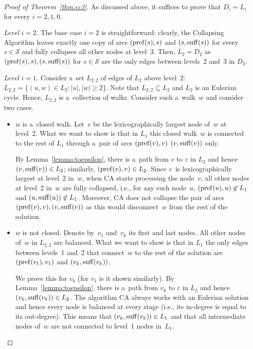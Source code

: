 \begin{proof}[Proof of Theorem~\ref{thm:cc3}]
As discussed above, it suffices to prove that $D_i=L_i$ for every $i=2,1,0$.

\begin{description}
\item {\em Level $i=2$.} The base case $i=2$ is straightforward: clearly, the Collapsing Algorithm leaves exactly one copy of arcs $(\operatorname{pref}(s), s)$ and $(s, \operatorname{suff}(s))$ for every $s \in \mathcal{S}$ and fully collapses all other nodes at level~$3$. Then, $L_2=D_2$ as $(\operatorname{pref}(s), s), (s, \operatorname{suff}(s))$ for $s \in \mathcal{S}$ are the only edges between levels~2 and~3 in $D_3$.

\item {\em Level $i=1$.} Consider a~set $L_{2,2}$ of edges of $L_2$ above level~$2$: $L_{2,2}=\{(u,w) \in L_2 \colon |u|,|w| \ge 2\}$. Note that $L_{2,2} \subseteq L_2$ and $L_2$ is an Eulerian cycle. Hence, $L_{2,2}$ is a~collection of walks. Consider such a~walk~$w$ and consider two cases.
\begin{itemize}
\item $w$ is a~closed walk. Let~$v$ be the lexicographically largest node of~$w$ at level~2. What we want to show is that in $L_1$ this closed walk~$w$ is connected to the rest of $L_1$ through a~pair of arcs $(\operatorname{pref}(v), v)$ $(v, \operatorname{suff}(v))$ only.

By Lemma~\ref{lemma:toepsilon}, there is a~path from $v$ to $\varepsilon$ in $L_2$ and hence $(v, \operatorname{suff}(v)) \in L_2$; similarly, $(\operatorname{pref}(v), v) \in L_2$. Since $v$~is lexicographically largest at level~$2$ in~$w$, when CA starts processing the node~$v$, all other nodes at level~2 in~$w$ are fully collapsed, i.e., for any such node~$u$, $(\operatorname{pref}(u), u) \not \in L_1$ and $(u, \operatorname{suff}(u)) \not \in  L_1$. Moreover, CA does not collapse the pair of arcs 
$(\operatorname{pref}(v), v), (v, \operatorname{suff}(v))$ as this would disconnect~$w$ from the rest of the solution.

\item $w$ is not closed. Denote by~$v_1$ and~$v_k$ its first and last nodes. All other nodes of~$w$ in $L_{2,2}$ are balanced. What we want to show is that in $L_1$ the only edges between levels~1 and~2 that connect~$w$ to the rest of the solution are $(\operatorname{pref}(v_1), v_1)$ and $(v_k, \operatorname{suff}(v_k))$.

We prove this for $v_k$ (for $v_1$ is it shown similarly). By Lemma~\ref{lemma:toepsilon}, there is a~path from $v_k$ to $\varepsilon$ in $L_2$ and hence $(v_k, \operatorname{suff}(v_k)) \in L_2$. The algorithm CA always works with an Eulerian solution and hence every node is balanced at every stage (i.e., its in-degree is equal to its out-degree). This means that $(v_k, \operatorname{suff}(v_k)) \in L_1$ and that all intermediate nodes of~$w$ are not connected to level~1 nodes in~$L_1$.
\end{itemize}


\end{description}
\end{proof}

